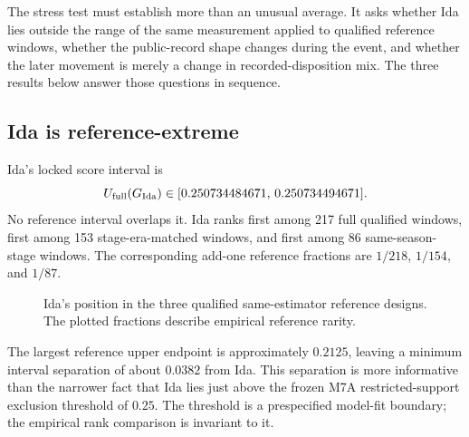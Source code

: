 \documentclass[11pt]{article}
\begin{document}
The stress test must establish more than an unusual average. It asks whether Ida lies outside the range of the same measurement applied to qualified reference windows, whether the public-record shape changes during the event, and whether the later movement is merely a change in recorded-disposition mix. The three results below answer those questions in sequence.

\subsection{Ida is reference-extreme}

Ida's locked score interval is
\begin{equation}
U_{\mathrm{full}}(G_{\mathrm{Ida}})\in
[0.250734484671,\,0.250734494671].
\end{equation}
No reference interval overlaps it. Ida ranks first among 217 full qualified windows, first among 153 stage-era-matched windows, and first among 86 same-season-stage windows. The corresponding add-one reference fractions are $1/218$, $1/154$, and $1/87$.

\begin{figure}[t]
\centering
{}
\caption{Ida's position in the three qualified same-estimator reference designs. The plotted fractions describe empirical reference rarity.}
\label{fig:rank}
\end{figure}

The largest reference upper endpoint is approximately $0.2125$, leaving a minimum interval separation of about $0.0382$ from Ida. This separation is more informative than the narrower fact that Ida lies just above the frozen M7A restricted-support exclusion threshold of $0.25$. The threshold is a prespecified model-fit boundary; the empirical rank comparison is invariant to it.
\end{document}
